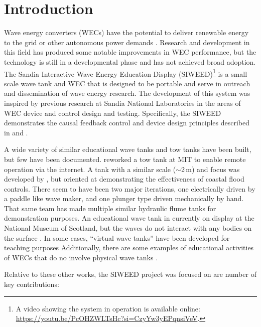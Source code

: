\documentclass[hardware,article,submit,pdftex,moreauthors]{Definitions/mdpi}
\begin{document}
\section{Introduction}
Wave energy converters (WECs) have the potential to deliver renewable energy to the grid or other autonomous power demands \cite{Hagerman:2011aa,Clement2002,FALCAO2010899}.
Research and development in this field has produced some notable improvements in WEC performance, but the technology is still in a developmental phase and has not achieved broad adoption.
The Sandia Interactive Wave Energy Education Display (SIWEED)\footnote{A video showing the system in operation is available online: \url{https://youtu.be/PcOHZWLTsHc?si=CzyYw3yEPqnsiVeV}.} is a small scale wave tank and WEC that is designed to be portable and serve in outreach and dissemination of wave energy research.
The development of this system was inspired by previous research at Sandia National Laboratories in the areas of WEC device and control design and testing.
Specifically, the SIWEED demonstrates the causal feedback control and device design principles described in \citet{Bacelli2020} and \citet{Coe:2021aa}.

A wide variety of similar educational wave tanks and tow tanks have been built, but few have been documented.
\citet{unger2006creating} reworked a tow tank at MIT to enable remote operation via the internet.
A tank with a similar scale ($\sim$2\,m) and focus was developed by \cite{Trust2015}, but oriented at demonstrating the effectiveness of coastal flood controls.
There seem to have been two major iterations, one electrically driven by a paddle like wave maker, and one plunger type driven mechanically by hand. 
That same team has made multiple similar hydraulic flume tanks for demonstration purposes.
An educational wave tank in currently on display at the National Museum of Scotland, but the waves do not interact with any bodies on the surface \cite{Ivan2016}.
In some cases, ``virtual wave tanks'' have been developed for teaching purposes \cite{Ryu:2003aa}
Additionally, there are some examples of educational activities of WECs that do no involve physical wave tanks \cite{Huynh:2016aa,Satriawan:2022aa,Satriawan:2024aa}.

Relative to these other works, the SIWEED project was focused on are number of key contributions:
\end{document}
